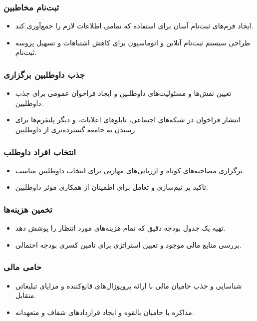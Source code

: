 \subsubsection*{ثبت‌نام مخاطبین}
\begin{itemize}
	\item ایجاد فرم‌های ثبت‌نام آسان برای استفاده که تمامی اطلاعات لازم را جمع‌آوری کند.
	\item طراحی سیستم ثبت‌نام آنلاین و اتوماسیون برای کاهش اشتباهات و تسهیل پروسه ثبت‌نام.
\end{itemize}

\subsubsection*{جذب داوطلبین برگزاری}
\begin{itemize}
	\item تعیین نقش‌ها و مسئولیت‌های داوطلبین و ایجاد فراخوان عمومی برای جذب داوطلبین.
	\item انتشار فراخوان در شبکه‌های اجتماعی، تابلوهای اعلانات، و دیگر پلتفرم‌ها برای رسیدن به جامعه گسترده‌تری از داوطلبین.
\end{itemize}

\subsubsection*{انتخاب افراد داوطلب}
\begin{itemize}
	\item برگزاری مصاحبه‌های کوتاه و ارزیابی‌های مهارتی برای انتخاب داوطلبین مناسب.
	\item تاکید بر تیم‌سازی و تعامل برای اطمینان از همکاری موثر داوطلبین.
\end{itemize}

\subsubsection*{تخمین هزینه‌ها}
\begin{itemize}
	\item تهیه یک جدول بودجه دقیق که تمام هزینه‌های مورد انتظار را پوشش دهد.
	\item بررسی منابع مالی موجود و تعیین استراتژی برای تامین کسری بودجه احتمالی.
\end{itemize}

\subsubsection*{حامی مالی}
\begin{itemize}
	\item شناسایی و جذب حامیان مالی با ارائه پروپوزال‌های قانع‌کننده و مزایای تبلیغاتی متقابل.
	\item مذاکره با حامیان بالقوه و ایجاد قراردادهای شفاف و متعهدانه.
\end{itemize}

